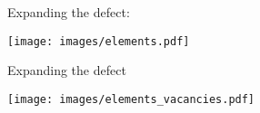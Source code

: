 \begin{frame}{Expanding the defect:  } %
  \begin{center}
    \texttt{[image: images/elements.pdf]}
  \end{center}
\end{frame}

\begin{frame}{Expanding the defect} %
  \begin{center}
    \texttt{[image: images/elements\_vacancies.pdf]}
  \end{center}
\end{frame}

